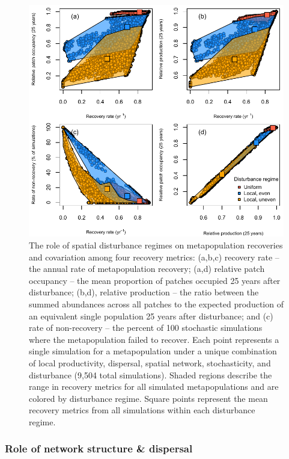 \documentclass[
]{article}
\begin{document}
\begin{figure}[H]

{\centering \includegraphics{Managing_for_ecological_surprises_in_metapopulations_files/figure-latex/disturbance regime-1} 

}

\caption{The role of spatial disturbance regimes on metapopulation recoveries and covariation among four recovery metrics: (a,b,c) recovery rate – the annual rate of metapopulation recovery; (a,d) relative patch occupancy – the mean proportion of patches occupied 25 years after disturbance; (b,d), relative production – the ratio between the summed abundances across all patches to the expected production of an equivalent single population 25 years after disturbance; and (c) rate of non-recovery – the percent of 100 stochastic simulations where the metapopulation failed to recover. Each point represents a single simulation for a metapopulation under a unique combination of local productivity, dispersal, spatial network, stochasticity, and disturbance (9,504 total simulations). Shaded regions describe the range in recovery metrics for all simulated metapopulations and are colored by disturbance regime. Square points represent the mean recovery metrics from all simulations within each disturbance regime.}\label{fig:disturbance regime}
\end{figure}
\newpage

\hypertarget{role-of-network-structure-dispersal}{%
\subsubsection{Role of network structure \&
dispersal}\label{role-of-network-structure-dispersal}}
\end{document}
